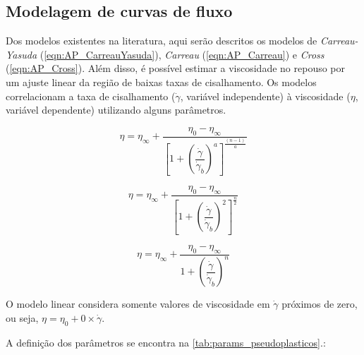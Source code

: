 			\subsection{Modelagem de curvas de fluxo}
			\label{sec:modelagem_curva_fluxo}
			Dos modelos existentes na literatura, aqui serão descritos os modelos de \emph{Carreau-Yasuda} (\ref{eqn:AP_CarreauYasuda})\cite{Kwiatkowski2016a}, \emph{Carreau} (\autoref{eqn:AP_Carreau})\cite{Boger1989} e \emph{Cross} (\autoref{eqn:AP_Cross})\cite{Boger1989}. Além disso, é possível estimar a viscosidade no repouso por um ajuste linear da região de baixas taxas de cisalhamento. Os modelos correlacionam a taxa de cisalhamento (\(\dot{\gamma}\), variável independente) à viscosidade (\(\eta\), variável dependente) utilizando alguns parâmetros.
			
			\begin{equation}
			\eta = \eta_{\infty} + \frac{\eta_0 - \eta_{\infty}}{\left[  1 + \left(  \dfrac{\dot{\gamma}}{\dot{\gamma}_b}  \right)^{a}  \right]^{\frac{ \left(  n - 1  \right) }{a}}}
			\label{eqn:AP_CarreauYasuda}
			\end{equation}
			
			\begin{equation}
			\eta = \eta_{\infty} + \frac{\eta_0 - \eta_{\infty}}{\left[  1 + \left(  \dfrac{\dot{\gamma}}{\dot{\gamma}_b}  \right)^{2}  \right]^{\frac{n}{2}}}
			\label{eqn:AP_Carreau}
			\end{equation}
			
			\begin{equation}
			\eta = \eta_{\infty} + \frac{\eta_0 - \eta_{\infty}}{1 + \left(  \dfrac{\dot{\gamma}}{\dot{\gamma}_b}  \right)^{n}}
			\label{eqn:AP_Cross}
			\end{equation}
			
			O modelo linear considera somente valores de viscosidade em \(\dot{\gamma}\) próximos de zero, ou seja, \(\eta = \eta_0 + 0 \times \dot{\gamma}\).
			
			A definição dos parâmetros se encontra na \autoref{tab:params_pseudoplasticos}.\cite{WLM_Advances}:
			
